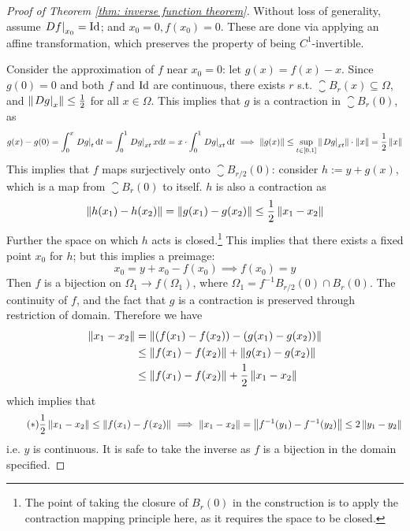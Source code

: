 \documentclass{article}
\begin{document}
\begin{proof}[Proof of Theorem \ref{thm: inverse function theorem}]
    Without loss of generality, assume $\left.Df\right|_{x_0} = \mathrm{Id}$; and $x_0 = 0, f(x_0) = 0$. These are done via applying an affine transformation, which preserves the property of being $C^1$-invertible. 

    Consider the approximation of $f$ near $x_0 = 0$: let $g(x) = f(x) - x$. Since $g(0) = 0$ and both $f$ and $\mathrm{Id}$ are continuous, there exists $r$ s.t. $\closure{B_r(x)} \subseteq \Omega$, and $\left\|\left.Dg\right|_{x}\right\| \leq \frac{1}{2}$ for all $x \in \Omega$. This implies that $g$ is a contraction in $\closure{B_r(0)}$, as
    \[
        g(x) - g(0) = \int_{0}^{x} \left.Dg\right|_{t} \mathrm{d} t = \int_{0}^{1} \left.Dg\right|_{xt} x \mathrm{d} t = x\cdot \int_{0}^{1} \left.Dg\right|_{xt} \mathrm{d} t \ \Longrightarrow\  
        \left\|g(x)\right\| \leq \sup_{t \in [0, 1]} \left\|\left.Dg\right|_{xt}\right\| \cdot \left\|x\right\| = \frac{1}{2} \left\|x\right\|
    \]
    This implies that $f$ maps surjectively onto $\closure{B_{r/2}(0)}$: consider $h := y + g(x)$, which is a map from $\closure{B_r(0)}$ to itself. $h$ is also a contraction as
    \[
        \left\|h(x_1) - h(x_2)\right\| = \left\|g(x_1) - g(x_2)\right\| \leq \frac{1}{2} \left\|x_1 - x_2\right\|
    \] 
    Further the space on which $h$ acts is closed.\footnote{The point of taking the closure of $B_r(0)$ in the construction is to apply the contraction mapping principle here, as it requires the space to be closed.} This implies that there exists a fixed point $x_0$ for $h$; but this implies a preimage:
    \[
        x_0 = y + x_0 - f(x_0) \implies f(x_0) = y
    \]
    Then $f$ is a bijection on $\Omega_1 \to f(\Omega_1)$, where $\Omega_1 = f^{-1} B_{r/2}(0) \cap B_r(0)$. The continuity of $f$, and the fact that $g$ is a contraction is preserved through restriction of domain. Therefore we have
    \begin{align*}
        \left\|x_1 - x_2\right\| 
        & = \left\|(f(x_1) - f(x_2)) - (g(x_1) - g(x_2))\right\| \\
        & \leq \left\|f(x_1) - f(x_2)\right\| + \left\|g(x_1) - g(x_2)\right\| \\
        & \leq \left\|f(x_1) - f(x_2)\right\| + \frac{1}{2} \left\|x_1 - x_2\right\|
    \end{align*}
    which implies that 
    \begin{equation}\tag{$\ast$}\label{eq: linear bound on f}
        \frac{1}{2} \left\|x_1 - x_2\right\| \leq \left\|f(x_1) - f(x_2)\right\| \ \Longrightarrow\  \left\|x_1 - x_2\right\| = \left\|f^{-1}(y_1) - f^{-1}(y_2)\right\| \leq 2\left\|y_1 - y_2\right\|
    \end{equation}
    i.e. $y$ is continuous. It is safe to take the inverse as $f$ is a bijection in the domain specified. 


\end{proof}
\end{document}
